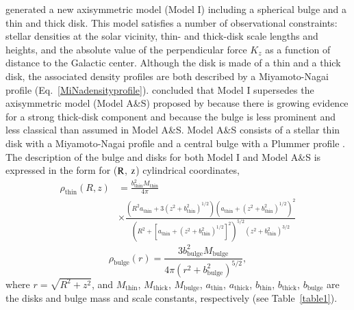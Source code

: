 \documentclass{aa}
\begin{document}
\citet{Pouliasis2017} generated a new axisymmetric model (Model I) including a spherical bulge and a thin and thick disk. This model satisfies a number of observational constraints: stellar densities at the solar vicinity, thin- and thick-disk scale lengths and heights, and the absolute value of the perpendicular force $K_z$ as a function of distance to the Galactic center. Although the disk is made of a thin and a thick disk, the associated density profiles are both described by a Miyamoto-Nagai profile (Eq.~\ref{MiNadensityprofile}). 
\citet{Pouliasis2017} concluded that Model I supersedes the axisymmetric model (Model A\&S) proposed by \citet{Allen1991} because there is growing evidence for a strong thick-disk component and because the bulge is less prominent and less classical than assumed in  Model A\&S. Model A\&S consists of a stellar thin disk with a Miyamoto-Nagai profile \citep{Miyamoto1975} and a central bulge with a Plummer profile \citep{Binney2011}. The description of the bulge and disks for both Model I and Model A\&S is expressed in the form \citep{Pouliasis2017} for ($\rm R$, $\rm z$) cylindrical coordinates,
\begin{equation}
\begin{aligned}
\rho_{\operatorname{thin}}(R, z) & = \frac{b_{\operatorname{thin}}^{2} M_{\operatorname{thin}}}{4 \pi}\\
&\times\frac{\left(R^{2} a_{\mathrm{thin}}+3\left(z^{2}+b_{\mathrm{thin}}^{2}\right)^{1 / 2}\right)\left(a_{\mathrm{thin}}+\left(z^{2}+b_{\mathrm{thin}}^{2}\right)^{1 / 2}\right)^{2}}{\left(R^{2}+\left[a_{\mathrm{thin}}+\left(z^{2}+b_{\mathrm{thin}}^{2}\right)^{1 / 2}\right]^{2}\right)^{5 / 2}\left(z^{2}+b_{\mathrm{thin}}^{2}\right)^{3 / 2}}
\label{MiNadensityprofile}
\end{aligned}
\end{equation}
\begin{equation}
\rho_{\mathrm{bulge}}(r)= \frac{3 b_{\mathrm{bulge}}^{2} M_{\mathrm{bulge}}}{4 \pi\left(r^{2}+b_{\mathrm{bulge}}^{2}\right)^{5 / 2}} 
\label{Plummerdensityprofile}
,\end{equation}
where $r=\sqrt{R^2+z^2}$, and $M_{\mathrm{thin}}$, $M_{\mathrm{thick}}$, $M_{\mathrm{bulge}}$, $a_{\mathrm{thin}}$, $a_{\mathrm{thick}}$,  $b_{\mathrm{thin}}$, $b_{\mathrm{thick}}$, $b_{\mathrm{bulge}}$ are the disks and bulge mass and scale constants, respectively (see Table~\ref{table1}).
\end{document}
